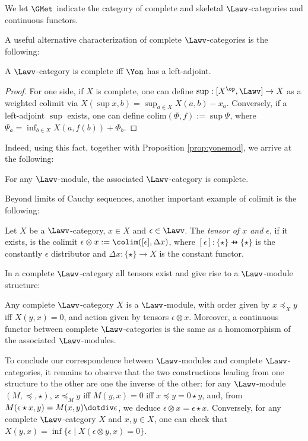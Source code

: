 We let $\GMet$ indicate the category of complete and skeletal $\Lawv$-categories and continuous functors. 

A useful alternative characterization of complete $\Lawv$-categories is the following:
\begin{proposition}
A $\Lawv$-category is complete iff $\Yon$ has a left-adjoint. 
\end{proposition}
\begin{proof}
For one side, if $X$ is complete, one can define $\sup : [X^{\op},\Lawv]\to X$ as a weighted colimit via $X(\sup x,b)=\sup_{a\in X}
X(a,b)-x_{a}$. Conversely, if a left-adjoint $\sup $ exists, one can define $\mathrm{colim}(\Phi,f):= \sup \Psi$, where $\Psi_{a}=\inf_{b\in X}X(a,f(b))+\Phi_{b}$. 
\end{proof}

Indeed, using this fact, together with Proposition \ref{prop:yonemod}, we arrive at the following:
\begin{proposition}
For any $\Lawv$-module, the associated $\Lawv$-category is complete. 
\end{proposition}

Beyond limits of Cauchy sequences, another important example of colimit is the following:
\begin{definition}
Let $X$ be a $\Lawv$-category, $x\in X$ and $\epsilon \in \Lawv$. The \emph{tensor of $x$ and $\epsilon$}, if it exists, is the colimit $\epsilon \otimes x:= \colim( [\epsilon],\Delta x)$, where
$[\epsilon]: \{\star\}\pfun \{\star\}$ is the constantly $\epsilon$ distributor
and $\Delta x:\{\star\}\to X$ is the constant functor. 
\end{definition}

In a complete $\Lawv$-category all tensors exist and give rise to a $\Lawv$-module structure:
\begin{proposition}
Any complete $\Lawv$-category $X$ is a $\Lawv$-module, with order given by $x\preceq_{X}y $ iff $X(y,x)=0$, and 
action given by tensors $\epsilon \otimes x$. Moreover, a continuous functor between complete $\Lawv$-categories is the same as a homomorphism of the associated $\Lawv$-modules. 
\end{proposition}


To conclude our correspondence between $\Lawv$-modules and complete $\Lawv$-categories, it remains to observe that the 
two constructions leading from one structure to the other are one the inverse of the other: for any $\Lawv$-module $(M,\preceq,\star)$,
$x\preceq_{M}y$ iff $M(y,x)=0$ iff $x\preceq y=0\star y$, and, from  
$M(\epsilon \star x, y)= M(x,y)\dotdiv \epsilon$, we deduce $\epsilon\otimes x=\epsilon \star x$. 
Conversely, 
for any complete $\Lawv$-category $X$ and $x,y\in X$, one can check that 
$X(y,x)=\inf\{ \epsilon \mid X(\epsilon\otimes y,x )=0\}$.

